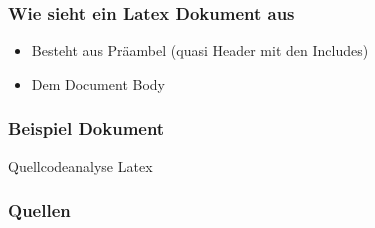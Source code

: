 \documentclass{beamer}
\begin{document}
\begin{frame}[<+->]\frametitle{Wie sieht ein Latex Dokument aus}
    \pause
    \begin{itemize}
    	\item Besteht aus Präambel (quasi Header mit den Includes)
    	\item Dem Document Body
	\end{itemize}	
\end{frame}

\begin{frame}[fragile]\frametitle{Beispiel Dokument}

	Quellcodeanalyse Latex

\end{frame}

\begin{frame}[allowframebreaks]
        \frametitle{Quellen}
        \nocite{stackOv}
        \nocite{Meyers2011}
        \nocite{martin2008clean}
        
        
\end{frame}
\end{document}
